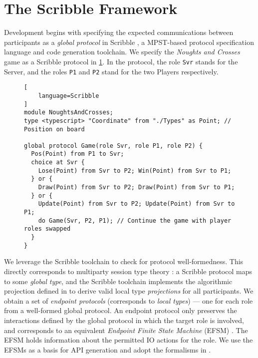 \section{The Scribble Framework}
\label{section:scribble}

Development begins with specifying the expected communications between
participants as a \textit{global protocol} in Scribble \cite{Scribble}, a
MPST-based protocol specification language and code generation toolchain.
We specify the \textit{Noughts and Crosses} game as a Scribble protocol in
\cref{lst:game}.
In the protocol, the role \texttt{Svr} stands for the Server, and the roles
\texttt{P1} and \texttt{P2} stand for the two Players respectively.

\begin{figure}[!ht]
\begin{lstlisting}[
	language=Scribble
]
module NoughtsAndCrosses;
type <typescript> "Coordinate" from "./Types" as Point;	// Position on board

global protocol Game(role Svr, role P1, role P2) {
  Pos(Point) from P1 to Svr;
  choice at Svr {
    Lose(Point) from Svr to P2; Win(Point) from Svr to P1;
  } or {
    Draw(Point) from Svr to P2; Draw(Point) from Svr to P1;
  } or {
    Update(Point) from Svr to P2; Update(Point) from Svr to P1;
    do Game(Svr, P2, P1); // Continue the game with player roles swapped
  }
}
\end{lstlisting}
\label{lst:game}
\end{figure}

We leverage the Scribble toolchain to check for protocol
well-formedness.
This directly corresponds to multiparty session
type theory \cite{FeatherweightScribble}:
a Scribble protocol maps to some \textit{global type}, and the Scribble
toolchain implements the algorithmic projection defined in \cite{MPST} to
derive valid local type \textit{projections} for all participants.
We obtain a set of \textit{endpoint protocols} (corresponds to \emph{local
  types}) --- one for each role from a
well-formed global protocol.
An endpoint protocol only preserves the interactions defined by the global
protocol in which the target role is involved, and corresponds to an equivalent
\textit{Endpoint Finite State Machine} (EFSM) \cite{ICALP13CFSM}.
The EFSM holds information about the permitted IO actions for the role.
We use the EFSMs as a basis for API generation and adopt the formalisms in
\cite{Hybrid2016}.


